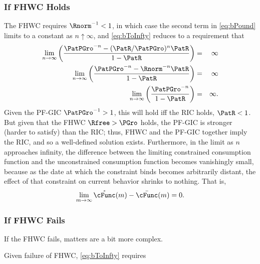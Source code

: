 \documentclass[../BufferStockTheory.tex]{subfiles}
\begin{document}
\subsubsection{If FHWC Holds}
The FHWC requires $\Rnorm^{-1} < 1$, in which case the second term in \eqref{eq:bPound} limits to a constant as $n \uparrow \infty$, and \eqref{eq:bToInfty} reduces to a requirement that
\begin{eqnarray*}
  \lim_{n \rightarrow \infty} \left(\frac{\PatPGro^{-n}-(\PatR/\PatPGro)^{n}\PatR}{1-\PatR}\right) & = & \infty
\\  \lim_{n \rightarrow \infty} \left(\frac{\PatPGro^{-n}-\Rnorm^{-n}\PatR}{1-\PatR}\right) & = & \infty
\\  \lim_{n \rightarrow \infty} \left(\frac{\PatPGro^{-n}}{1-\PatR}\right) & = & \infty.
\end{eqnarray*}
Given the PF-GIC $\PatPGro^{-1}>1$, this will hold iff the RIC holds, $\PatR < 1$.  But given that the FHWC
$\Rfree > \PGro$ holds, the PF-GIC is stronger (harder to satisfy) than the RIC; thus, FHWC
and the PF-GIC together imply the RIC, and so a well-defined
solution exists.  Furthermore, in the limit as $n$ approaches
infinity, the difference between the limiting constrained consumption
function and the unconstrained consumption function becomes
vanishingly small, because as the date at which the constraint binds
becomes arbitrarily distant, the effect of that constraint on current
behavior shrinks to nothing.  That is,
\begin{eqnarray}
\lim_{m \rightarrow \infty}\mathring{\cFunc}(m) - \bar{\cFunc}(m) = 0.
\end{eqnarray}


\subsubsection{If FHWC Fails}
If the FHWC fails, matters are a bit more complex.
\begin{comment}
As noted in the main text, the Finite Value Requirement for such a consumer
requires $\PatPGro < (\Rfree/\PGro)^{1/\CRRA}$,\footnote{A
  unique well-defined nondegenerate limiting consumption function can
  actually exist even if a nondegenerate value function does not.  But
  the parametric combinations required for this are somewhat peculiar
  (including both $\Rfree < 1$ and $\PGro < 1$); but we restrict our attention
  to the more useful and plausible cases with finite value.} which is stronger (holds
in strictly fewer circumstances) than the PF-GIC condition $\PatPGro < 1$.
Thus, the PF-GIC is an implication of \cancel{FHWC}.
\end{comment}
Given failure of FHWC, \eqref{eq:bToInfty} requires
\end{document}

